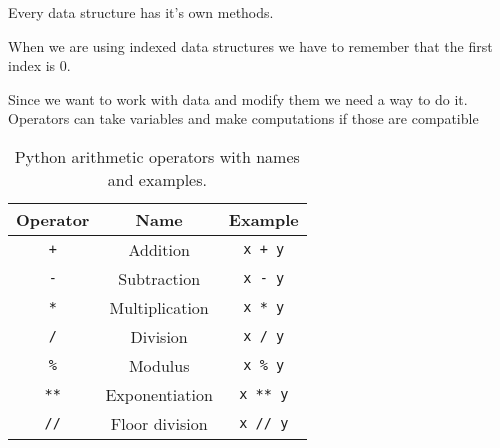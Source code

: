 \vspace{10pt}

Every data structure has it's own methods.

When we are using indexed data structures we have to remember that the first index is 0.

\vspace{10pt}

Since we want to work with data and modify them we need a way to do it. Operators can take variables and make computations if those are compatible

\begin{table}[h!]
\centering
\renewcommand{\arraystretch}{1.3}
\begin{tabular}{|c|c|c|}
\hline
\textbf{Operator} & \textbf{Name} & \textbf{Example} \\
\hline
\texttt{+}  & Addition        & \texttt{x + y}  \\
\texttt{-}  & Subtraction     & \texttt{x - y}  \\
\texttt{*}  & Multiplication  & \texttt{x * y}  \\
\texttt{/}  & Division        & \texttt{x / y}  \\
\texttt{\%} & Modulus         & \texttt{x \% y} \\
\texttt{**} & Exponentiation  & \texttt{x ** y} \\
\texttt{//} & Floor division  & \texttt{x // y} \\
\hline
\end{tabular}
\caption{Python arithmetic operators with names and examples.}
\end{table}
